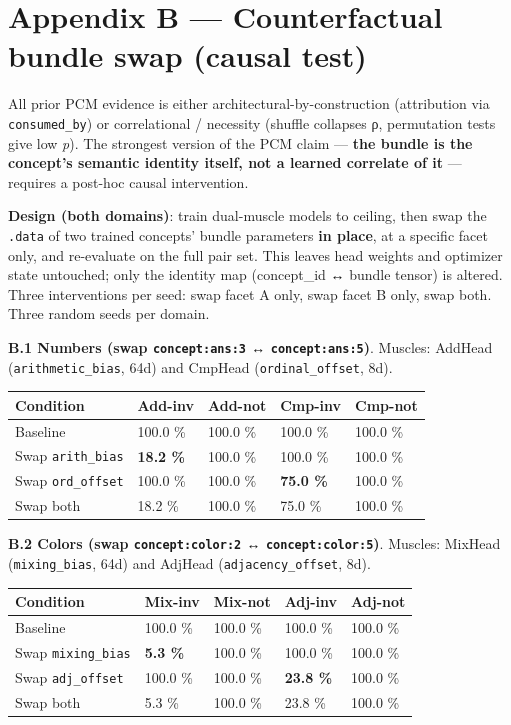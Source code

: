 \section{Appendix B --- Counterfactual bundle swap (causal test)}

All prior PCM evidence is either architectural-by-construction
(attribution via \texttt{consumed\_by}) or correlational / necessity
(shuffle collapses ρ, permutation tests give low \emph{p}). The strongest
version of the PCM claim --- \textbf{the bundle is the concept's semantic
identity itself, not a learned correlate of it} --- requires a
post-hoc causal intervention.

\textbf{Design (both domains)}: train dual-muscle models to ceiling,
then swap the \texttt{.data} of two trained concepts' bundle parameters
\textbf{in place}, at a specific facet only, and re-evaluate on the full
pair set. This leaves head weights and optimizer state untouched;
only the identity map (concept\_id ↔ bundle tensor) is altered. Three
interventions per seed: swap facet A only, swap facet B only, swap
both. Three random seeds per domain.

\textbf{B.1 Numbers (swap \texttt{concept:ans:3} ↔ \texttt{concept:ans:5})}.
Muscles: AddHead (\texttt{arithmetic\_bias}, 64d) and CmpHead
(\texttt{ordinal\_offset}, 8d).

\begin{longtable}[]{@{}lllll@{}}
\toprule
Condition & Add-inv & Add-not & Cmp-inv & Cmp-not\tabularnewline
\midrule
\endhead
Baseline & 100.0 \% & 100.0 \% & 100.0 \% & 100.0 \%\tabularnewline
Swap \texttt{arith\_bias} & \textbf{18.2 \%} & 100.0 \% & 100.0 \% & 100.0 \%\tabularnewline
Swap \texttt{ord\_offset} & 100.0 \% & 100.0 \% & \textbf{75.0 \%} & 100.0 \%\tabularnewline
Swap both & 18.2 \% & 100.0 \% & 75.0 \% & 100.0 \%\tabularnewline
\bottomrule
\end{longtable}

\textbf{B.2 Colors (swap \texttt{concept:color:2} ↔ \texttt{concept:color:5})}.
Muscles: MixHead (\texttt{mixing\_bias}, 64d) and AdjHead (\texttt{adjacency\_offset}, 8d).

\begin{longtable}[]{@{}lllll@{}}
\toprule
Condition & Mix-inv & Mix-not & Adj-inv & Adj-not\tabularnewline
\midrule
\endhead
Baseline & 100.0 \% & 100.0 \% & 100.0 \% & 100.0 \%\tabularnewline
Swap \texttt{mixing\_bias} & \textbf{5.3 \%} & 100.0 \% & 100.0 \% & 100.0 \%\tabularnewline
Swap \texttt{adj\_offset} & 100.0 \% & 100.0 \% & \textbf{23.8 \%} & 100.0 \%\tabularnewline
Swap both & 5.3 \% & 100.0 \% & 23.8 \% & 100.0 \%\tabularnewline
\bottomrule
\end{longtable}

